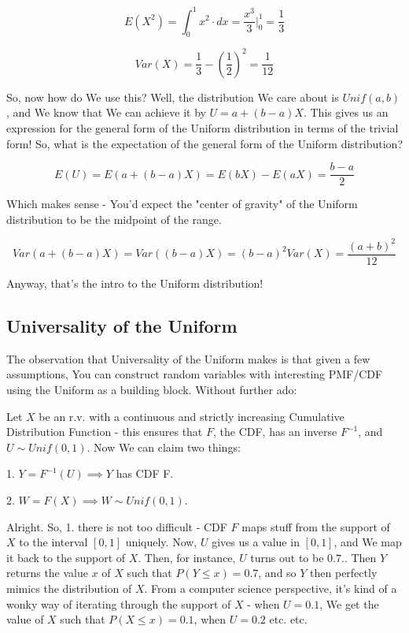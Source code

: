 \documentclass{article}
\begin{document}
		\[ E(X^2) = \int^1_0 x^2\cdot dx = \frac{x^3}{3}\bigg|^1_0 = \frac{1}{3} \]
		
		\[ Var(X) = \frac{1}{3} - \left(\frac{1}{2}\right)^2 = \frac{1}{12} \]
		
		So, now how do We use this? Well, the distribution We care about is $Unif(a, b)$, and We know that We can achieve it by $ U = a + (b-a)X $. This gives us an expression for the general form of the Uniform distribution in terms of the trivial form! So, what is the expectation of the general form of the Uniform distribution?
		
		\[ E(U) = E(a + (b-a)X) = E(bX) - E(aX) = \frac{b-a}{2} \]		
					
		Which makes sense - You'd expect the "center of gravity" of the Uniform distribution to be the midpoint of the range.
		
		\[ Var(a + (b-a)X) = Var((b-a)X) = (b-a)^2Var(X) = \frac{(a+b)^2}{12} \]
		
		Anyway, that's the intro to the Uniform distribution!
		
	\subsection{Universality of the Uniform}
	
		The observation that Universality of the Uniform makes is that given a few assumptions, You can construct random variables with interesting PMF/CDF using the Uniform as a building block. Without further ado:
		
		Let $X$ be an r.v. with a continuous and strictly increasing Cumulative Distribution Function - this ensures that $F$, the CDF, has an inverse $F^{-1}$, and $U\sim Unif(0, 1)$. Now We can claim two things:
		
		1. $Y = F^{-1}(U) \implies Y$ has CDF F.
		
		2. $W = F(X) \implies W\sim Unif(0, 1)$.
		
		Alright. So, 1. there is not too difficult - CDF $F$ maps stuff from the support of $X$ to the interval $[0, 1]$ uniquely. Now, $U$ gives us a value in $[0, 1]$, and We map it back to the support of $X$. Then, for instance, $U$ turns out to be $0.7$.. Then $Y$ returns the value $x$ of $X$ such that $P(Y \le x) = 0.7$, and so $Y$ then perfectly mimics the distribution of $X$. From a computer science perspective, it's kind of a wonky way of iterating through the support of $X$ - when $U = 0.1$, We get the value of $X$ such that $P(X \le x) = 0.1$, when $U = 0.2$ etc. etc. 	
		
\end{document}
